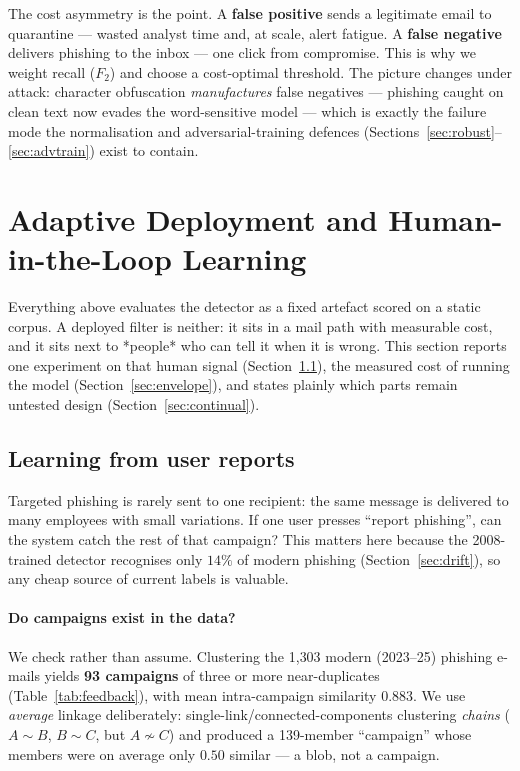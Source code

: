 \documentclass[11pt]{article}
\begin{document}
The cost asymmetry is the point. A \textbf{false positive} sends a legitimate email to
quarantine --- wasted analyst time and, at scale, alert fatigue. A \textbf{false
negative} delivers phishing to the inbox --- one click from compromise. This is why we
weight recall ($F_2$) and choose a cost-optimal threshold. The picture changes under
attack: character obfuscation \emph{manufactures} false negatives --- phishing caught
on clean text now evades the word-sensitive model --- which is exactly the failure mode
the normalisation and adversarial-training defences
(Sections~\ref{sec:robust}--\ref{sec:advtrain}) exist to contain.

\section{Adaptive Deployment and Human-in-the-Loop Learning}
\label{sec:deploy}
Everything above evaluates the detector as a fixed artefact scored on a static corpus. A deployed
filter is neither: it sits in a mail path with measurable cost, and it sits next to *people* who can
tell it when it is wrong. This section reports one experiment on that human signal
(Section~\ref{sec:feedback}), the measured cost of running the model
(Section~\ref{sec:envelope}), and states plainly which parts remain untested design
(Section~\ref{sec:continual}).

\subsection{Learning from user reports}
\label{sec:feedback}
Targeted phishing is rarely sent to one recipient: the same message is delivered to many employees
with small variations. If one user presses ``report phishing'', can the system catch the rest of that
campaign? This matters here because the 2008-trained detector recognises only $14\%$ of modern
phishing (Section~\ref{sec:drift}), so any cheap source of current labels is valuable.

\paragraph{Do campaigns exist in the data?} We check rather than assume. Clustering the 1{,}303
modern (2023--25) phishing e-mails yields \textbf{93 campaigns} of three or more near-duplicates
(Table~\ref{tab:feedback}), with mean intra-campaign similarity $0.883$. We use \emph{average}
linkage deliberately: single-link/connected-components clustering \emph{chains} ($A\sim B$, $B \sim
C$, but $A \not\sim C$) and produced a 139-member ``campaign'' whose members were on average only
$0.50$ similar --- a blob, not a campaign.
\end{document}
